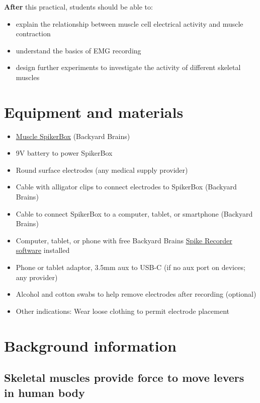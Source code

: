 \documentclass{article}
\begin{document}
\textbf{After} this practical, students should be able to:

\begin{itemize}
\item explain the relationship between muscle cell electrical activity and muscle contraction
\item understand the basics of EMG recording
\item design further experiments to investigate the activity of different skeletal muscles
\end{itemize}

\section{Equipment and materials}

\begin{itemize}
\item \href{https://backyardbrains.com/products/muscle-spikerbox}{Muscle SpikerBox} (Backyard Brains)
\item 9V battery to power SpikerBox
\item Round surface electrodes (any medical supply provider)
\item Cable with alligator clips to connect electrodes to SpikerBox (Backyard Brains)
\item Cable to connect SpikerBox to a computer, tablet, or smartphone (Backyard Brains)
\item Computer, tablet, or phone with free Backyard Brains \href{https://backyardbrains.com/products/byb-spike-recorder}{Spike Recorder software} installed
\item Phone or tablet adaptor, 3.5mm aux to USB-C (if no aux port on devices; any provider)
\item Alcohol and cotton swabs to help remove electrodes after recording (optional)
\item Other indications: Wear loose clothing to permit electrode placement
\end{itemize}

\section{Background information}

\subsection{Skeletal muscles provide force to move levers in human body}
\end{document}
